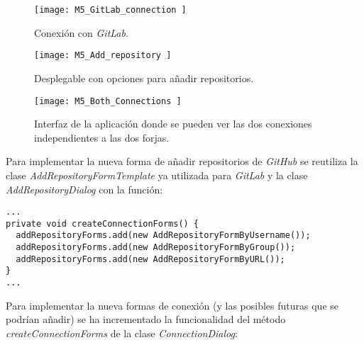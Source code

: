 \begin{figure}[!h]
	\centering
	\texttt{[image: M5\_GitLab\_connection ]}
	\caption{Conexión con \textit{GitLab}.}\label{fig:M5_GitLab_connection}
\end{figure}
\FloatBarrier

\begin{figure}[!h]
	\centering
	\texttt{[image: M5\_Add\_repository ]}
	\caption{Desplegable con opciones para añadir repositorios.}\label{fig:M5_Add_repository}
\end{figure}
\FloatBarrier

\begin{figure}[!h]
	\centering
	\texttt{[image: M5\_Both\_Connections ]}
	\caption{Interfaz de la aplicación donde se pueden ver las dos conexiones independientes a las dos forjas.}\label{fig:M5_Both_Connections}
\end{figure}
\FloatBarrier

Para implementar la nueva forma de añadir repositorios de \textit{GitHub} se reutiliza la clase \textit{AddRepositoryFormTemplate} ya utilizada para \textit{GitLab} y la clase \textit{AddRepositoryDialog} con la función:\\

\begin{minipage}{\linewidth}
{\tiny
\begin{verbatim}
...
private void createConnectionForms() {
  addRepositoryForms.add(new AddRepositoryFormByUsername());
  addRepositoryForms.add(new AddRepositoryFormByGroup());
  addRepositoryForms.add(new AddRepositoryFormByURL());
}
...
\end{verbatim}
}
\end{minipage}

\newpage
Para implementar la nueva formas de conexión (y las posibles futuras que se podrían añadir) se ha incrementado la funcionalidad del método \textit{createConnectionForms} de la clase \textit{ConnectionDialog}:\\

